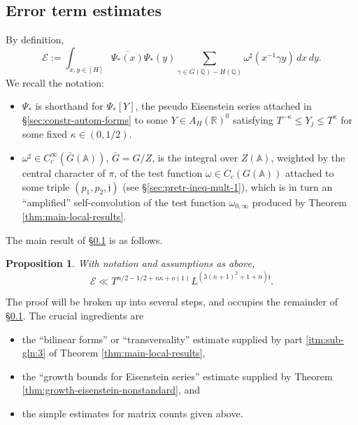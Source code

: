 \documentclass[reqno]{amsart}
\theoremstyle{plain} \newtheorem{theorem} {Theorem}
\newtheorem{proposition} [theorem] {Proposition}
\theoremstyle{definition} \newtheorem{definition} [theorem] {Definition}
\theoremstyle{itplain} %
\numberwithin{equation}{section}
\numberwithin{theorem}{section}
\renewcommand{\leq}{\leqslant}
\begin{document}
\subsection{Error term estimates}\label{sec:error-term-estimates}
By definition,
\begin{equation}\label{eq:mathcale-:=E--int}
  \mathcal{E}
  := \int _{x, y \in [H]} \overline{\Psi_{\ast}(x)} \Psi_{\ast}(y)
  \sum _{\gamma \in \bar{G}(\mathbb{Q}) - H(\mathbb{Q})} \omega^\sharp(x^{-1} \gamma y) \, d x \, d y.
\end{equation}
We recall the notation:
\begin{itemize}
\item $\Psi_{\ast}$ is shorthand for $\Psi_{\ast}[Y]$, the pseudo Eisenstein series attached in \S\ref{sec:constr-autom-forms} to some $Y \in A_H(\mathbb{R})^0$ satisfying $T^{-\kappa} \leq Y_j \leq T^{\kappa}$ for some fixed $\kappa \in (0,1/2)$.
\item $\omega^\sharp \in C_c^\infty(\bar{G}(\mathbb{A}))$, $\bar{G} = G/Z$, is the integral over $Z(\mathbb{A})$, weighted by the central character of $\pi$, of the test function $\omega \in C_c(G(\mathbb{A}))$ attached to some triple $(p_1,p_2,\mathfrak{j})$ (see \S\ref{sec:pretr-ineq-mult-1}), which is in turn an ``amplified'' self-convolution of the test function $\omega_{0,\infty}$ produced by Theorem \ref{thm:main-local-results}.
\end{itemize}
The main result of \S\ref{sec:error-term-estimates} is as follows.
\begin{proposition}\label{prop:standard2:with-notat-assumpt}
  With notation and assumptions as above,
  \begin{equation*}
    \mathcal{E} \ll
    T^{n/2 - 1/2 + n \kappa + o(1)}
    L^{(3 (n+1)^2 + 1 + n) \mathfrak{j}}.
  \end{equation*}
\end{proposition}
The proof will be broken up into several steps, and occupies the remainder of \S\ref{sec:error-term-estimates}.  The crucial ingredients are
\begin{itemize}
\item the ``bilinear forms'' or ``transversality'' estimate supplied by part \eqref{itm:sub-gln:3} of Theorem \ref{thm:main-local-results},
\item the ``growth bounds for Eisenstein series'' estimate supplied by Theorem \ref{thm:growth-eisenstein-nonstandard}, and
\item the simple estimates for matrix counts given above.
\end{itemize}
\end{document}
